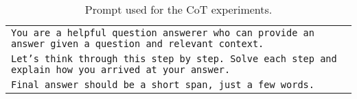 \begin{table*}[ht]
    \caption{Prompt used for the CoT \cite{weiChainofThoughtPromptingElicits2023} experiments.}
    \centering
    \small
    \begin{tabular}{>{\raggedright\arraybackslash\tt}p{}<{}}
      \toprule
      You are a helpful question answerer who can provide an answer given a question and relevant context.\\
      Let's think through this step by step. Solve each step and explain how you arrived at your answer.\\
      Final answer should be a short span, just a few words.\\
      \bottomrule
    \end{tabular}
    \label{tab:cot_prompt}
\end{table*}
